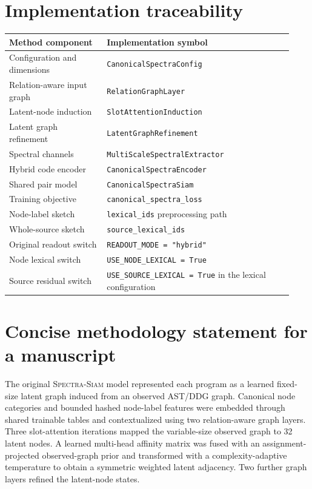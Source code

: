 \documentclass[11pt,a4paper]{article}
\newcommand{\method}{\textsc{Spectra-Siam}}
\begin{document}
\section{Implementation traceability}

\begin{longtable}{@{}p{0.32\linewidth}p{0.61\linewidth}@{}}
\toprule
Method component & Implementation symbol \\
\midrule
\endhead
Configuration and dimensions & \texttt{CanonicalSpectraConfig} \\
Relation-aware input graph & \texttt{RelationGraphLayer} \\
Latent-node induction & \texttt{SlotAttentionInduction} \\
Latent graph refinement & \texttt{LatentGraphRefinement} \\
Spectral channels & \texttt{MultiScaleSpectralExtractor} \\
Hybrid code encoder & \texttt{CanonicalSpectraEncoder} \\
Shared pair model & \texttt{CanonicalSpectraSiam} \\
Training objective & \texttt{canonical\_spectra\_loss} \\
Node-label sketch & \texttt{lexical\_ids} preprocessing path \\
Whole-source sketch & \texttt{source\_lexical\_ids} \\
Original readout switch & \texttt{READOUT\_MODE = "hybrid"} \\
Node lexical switch & \texttt{USE\_NODE\_LEXICAL = True} \\
Source residual switch & \texttt{USE\_SOURCE\_LEXICAL = True} in the lexical configuration \\
\bottomrule
\end{longtable}

\clearpage
\section{Concise methodology statement for a manuscript}

The original \method{} model represented each program as a learned fixed-size
latent graph induced from an observed AST/DDG graph. Canonical node categories
and bounded hashed node-label features were embedded through shared trainable
tables and contextualized using two relation-aware graph layers. Three
slot-attention iterations mapped the variable-size observed graph to 32 latent
nodes. A learned multi-head affinity matrix was fused with an assignment-projected
observed-graph prior and transformed with a complexity-adaptive temperature to
obtain a symmetric weighted latent adjacency. Two further graph layers refined
the latent-node states.
\end{document}
